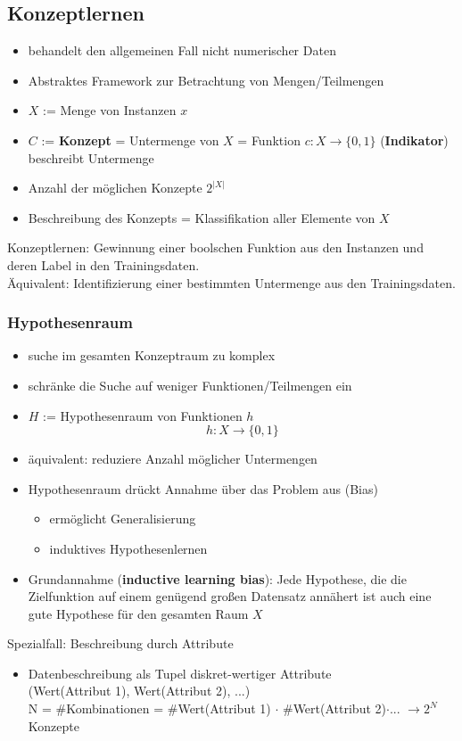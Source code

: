 	\subsection{Konzeptlernen}
	\begin{itemize}
		\item behandelt den allgemeinen Fall nicht numerischer Daten
		\item Abstraktes Framework zur Betrachtung von Mengen/Teilmengen
		\item $X$ := Menge von Instanzen $x$
		\item $C$ := \textbf{Konzept} = Untermenge von $X$ = Funktion $c:X\rightarrow\{0,1\}$ (\textbf{Indikator}) beschreibt Untermenge
		\item Anzahl der möglichen Konzepte $2^{\vert X\vert}$
		\item Beschreibung des Konzepts = Klassifikation aller Elemente von $X$ 
	\end{itemize}
	Konzeptlernen: Gewinnung einer boolschen Funktion aus den Instanzen und deren Label in den Trainingsdaten.\\[5pt]
	Äquivalent: Identifizierung einer bestimmten Untermenge aus den Trainingsdaten.
	\subsubsection{Hypothesenraum}
	\begin{itemize}
		\item suche im gesamten Konzeptraum zu komplex
		\item schränke die Suche auf weniger Funktionen/Teilmengen ein
		\item $H$ := Hypothesenraum von Funktionen $h$
		\begin{equation*}
			h:X\rightarrow\{0,1\}
		\end{equation*}
		\item äquivalent: reduziere Anzahl möglicher Untermengen
		\item Hypothesenraum drückt Annahme über das Problem aus (Bias)
		\begin{itemize}
			\item ermöglicht Generalisierung
			\item induktives Hypothesenlernen
		\end{itemize}
		\item Grundannahme (\textbf{inductive learning bias}): Jede Hypothese, die die Zielfunktion auf einem genügend großen Datensatz annähert ist auch eine gute Hypothese für den gesamten Raum $X$
	\end{itemize}
	Spezialfall: Beschreibung durch Attribute
	\begin{itemize}
		\item Datenbeschreibung als Tupel diskret-wertiger Attribute\\ 
		(\dq Wert(Attribut 1)\dq, \dq Wert(Attribut 2)\dq, ...)\\
		N = \#Kombinationen = \#Wert(Attribut 1) $\cdot$ \#Wert(Attribut 2)$\cdot$... $\rightarrow 2^N$ Konzepte
	\end{itemize}
